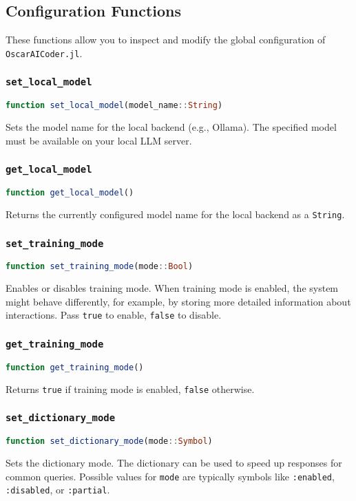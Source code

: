 \documentclass[11pt,a4paper]{article}
\newcommand{\code}[1]{\texttt{#1}}
\newcommand{\func}[1]{\texttt{#1}}
\newcommand{\modname}[1]{\texttt{#1}}
\providecommand{\code}[1]{\texttt{\color{blue!70!black}#1}}
\begin{document}
\subsection{Configuration Functions}
\label{sec:config_functions}

These functions allow you to inspect and modify the global configuration of \modname{OscarAICoder.jl}.

\subsubsection{\func{set\_local\_model}}
\begin{lstlisting}[language=Julia]
function set_local_model(model_name::String)
\end{lstlisting}
Sets the model name for the local backend (e.g., Ollama). The specified model must be available on your local LLM server.

\subsubsection{\func{get\_local\_model}}
\begin{lstlisting}[language=Julia]
function get_local_model()
\end{lstlisting}
Returns the currently configured model name for the local backend as a \code{String}.

\subsubsection{\func{set\_training\_mode}}
\begin{lstlisting}[language=Julia]
function set_training_mode(mode::Bool)
\end{lstlisting}
Enables or disables training mode. When training mode is enabled, the system might behave differently, for example, by storing more detailed information about interactions. Pass \code{true} to enable, \code{false} to disable.

\subsubsection{\func{get\_training\_mode}}
\begin{lstlisting}[language=Julia]
function get_training_mode()
\end{lstlisting}
Returns \code{true} if training mode is enabled, \code{false} otherwise.

\subsubsection{\func{set\_dictionary\_mode}}
\begin{lstlisting}[language=Julia]
function set_dictionary_mode(mode::Symbol)
\end{lstlisting}
Sets the dictionary mode. The dictionary can be used to speed up responses for common queries. Possible values for \code{mode} are typically symbols like \code{:enabled}, \code{:disabled}, or \code{:partial}.
\end{document}
